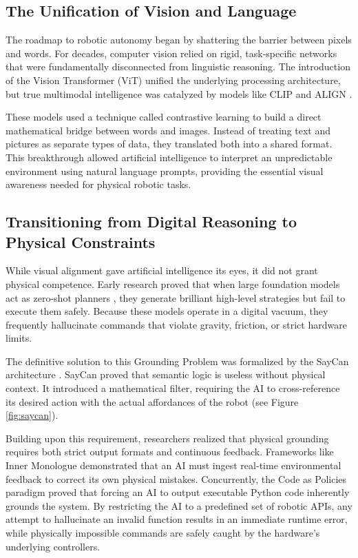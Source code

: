 \documentclass[a4paper, 12pt, twoside, openright]{book}
\begin{document}
\subsection{The Unification of Vision and Language}

The roadmap to robotic autonomy began by shattering the barrier between pixels and words. For decades, computer vision relied on rigid, task-specific networks that were fundamentally disconnected from linguistic reasoning. The introduction of the Vision Transformer (ViT) \cite{dosovitskiy2020image} unified the underlying processing architecture, but true multimodal intelligence was catalyzed by models like CLIP \cite{radford2021learning} and ALIGN \cite{jia2021scaling}. 

These models used a technique called contrastive learning to build a direct mathematical bridge between words and images. Instead of treating text and pictures as separate types of data, they translated both into a shared format. This breakthrough allowed artificial intelligence to interpret an unpredictable environment using natural language prompts, providing the essential visual awareness needed for physical robotic tasks.

\subsection{Transitioning from Digital Reasoning to Physical Constraints}

While visual alignment gave artificial intelligence its eyes, it did not grant physical competence. Early research proved that when large foundation models act as zero-shot planners \cite{huang2022language}, they generate brilliant high-level strategies but fail to execute them safely. Because these models operate in a digital vacuum, they frequently hallucinate commands that violate gravity, friction, or strict hardware limits.

The definitive solution to this Grounding Problem was formalized by the SayCan architecture \cite{ahn2022can}. SayCan proved that semantic logic is useless without physical context. It introduced a mathematical filter, requiring the AI to cross-reference its desired action with the actual affordances of the robot (see Figure \ref{fig:saycan}).

Building upon this requirement, researchers realized that physical grounding requires both strict output formats and continuous feedback. Frameworks like Inner Monologue \cite{huang2022inner} demonstrated that an AI must ingest real-time environmental feedback to correct its own physical mistakes. Concurrently, the Code as Policies paradigm \cite{liang2023code} proved that forcing an AI to output executable Python code inherently grounds the system. By restricting the AI to a predefined set of robotic APIs, any attempt to hallucinate an invalid function results in an immediate runtime error, while physically impossible commands are safely caught by the hardware's underlying controllers.
\end{document}
